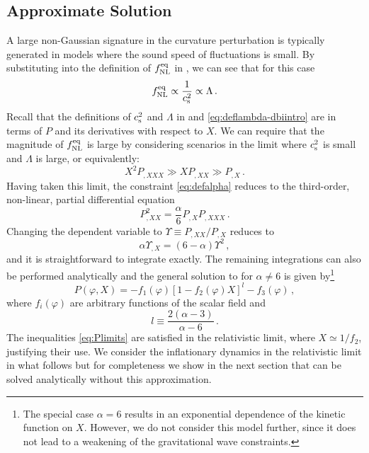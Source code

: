 \subsection{Approximate Solution}
\label{sec:approx-multi}
A large non-Gaussian signature in the curvature perturbation is 
typically generated in models where the sound speed of fluctuations 
is small.
By substituting  into the definition of $f_{\mathrm{NL}}^{\mathrm{eq}}$ in
, we can see that for this case
% 
\begin{equation}
 f_{\mathrm{NL}}^{\mathrm{eq}} \propto \frac{1}{c_\mathrm{s}^2} \propto \Lambda\,.
\end{equation}
% 
Recall that the definitions of $c_\mathrm{s}^2$ and $\Lambda$ in  and
\eqref{eq:deflambda-dbiintro} are in terms of $P$ and its derivatives with respect
to $X$. We can require that the magnitude of $f_{\mathrm{NL}}^{\mathrm{eq}}$ is large by considering
scenarios in the limit where $c_\mathrm{s}^2$ is small and $\Lambda$ is large, or
equivalently:
% 
\begin{equation}
\label{eq:Plimits}
X^2 P_{,XXX} \gg XP_{,XX} \gg P_{,X} \,.
\end{equation}
% 
Having taken this limit, the constraint \eqref{eq:defalpha} reduces to the 
third-order, non-linear, partial differential equation
% 
\begin{equation}
\label{eq:pde-multi}
P^2_{,XX} = \frac{\alpha}{6} P_{,X} P_{,XXX} \,.
\end{equation}
% 
Changing the dependent variable to $\Upsilon \equiv P_{,XX}/P_{,X}$ 
reduces  to
%  
\begin{equation}
\label{eq:Qdefn-multi}
\alpha \Upsilon_{,X} = (6-\alpha )\Upsilon^2 \,,
\end{equation}
% 
and it is straightforward to integrate  
exactly. The remaining integrations can also be performed analytically 
and the general solution to  for $\alpha \ne
6$ is given by\footnote{The special case $\alpha =6$ results in an 
exponential dependence of the kinetic function on $X$. However, we 
do not consider this model further, since it does not lead to a 
weakening of the gravitational wave constraints.}
% 
\begin{equation}
\label{eq:gensoln-multi}
P (\varphi , X) = -f_1 (\varphi ) \left[ 1-f_2 (\varphi ) X 
\right]^l -f_3(\varphi ) \,,
\end{equation}
% 
where $f_i (\varphi )$ are arbitrary functions of the scalar 
field and
%  
\begin{equation}
l \equiv \frac{2(\alpha -3 )}{\alpha -6} \, . 
\end{equation}
% 
The inequalities \eqref{eq:Plimits} 
are satisfied in the relativistic limit, where $X \simeq 1/f_2$, justifying their use.
We consider the inflationary dynamics in the relativistic limit in what follows but for
completeness we show in the next section that  can be solved
analytically without this approximation. 

